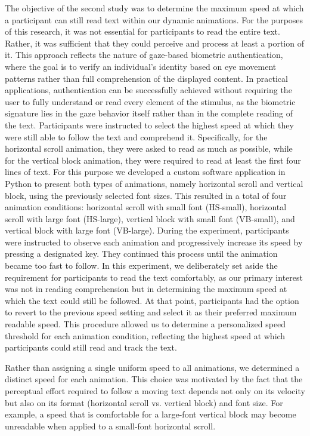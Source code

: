 \documentclass{article}
\begin{document}
The objective of the second study was to determine the maximum speed at which a participant can still read text within our dynamic animations. 
For the purposes of this research, it was not essential for participants to read the entire text. 
Rather, it was sufficient that they could perceive and process at least a portion of it. 
This approach reflects the nature of gaze-based biometric authentication, where the goal is to verify an individual's identity based on eye movement patterns rather than full comprehension of the displayed content. 
In practical applications, authentication can be successfully achieved without requiring the user to fully understand or read every element of the stimulus, as the biometric signature lies in the gaze behavior itself rather than in the complete reading of the text.
Participants were instructed to select the highest speed at which they were still able to follow the text and comprehend it.
Specifically, for the horizontal scroll animation, they were asked to read as much as possible, while for the vertical block animation, they were required to read at least the first four lines of text.
For this purpose we developed a custom software application in Python to present both types of animations, namely horizontal scroll and vertical block, using the previously selected font sizes.
This resulted in a total of four animation conditions: horizontal scroll with small font (HS-small), horizontal scroll with large font (HS-large), vertical block with small font (VB-small), and vertical block with large font (VB-large).
During the experiment, participants were instructed to observe each animation and progressively increase its speed by pressing a designated key. 
They continued this process until the animation became too fast to follow.
In this experiment, we deliberately set aside the requirement for participants to read the text comfortably, as our primary interest was not in reading comprehension but in determining the maximum speed at which the text could still be followed.
At that point, participants had the option to revert to the previous speed setting and select it as their preferred maximum readable speed. 
This procedure allowed us to determine a personalized speed threshold for each animation condition, reflecting the highest speed at which participants could still read and track the text. 

Rather than assigning a single uniform speed to all animations, we determined a distinct speed for each animation. 
This choice was motivated by the fact that the perceptual effort required to follow a moving text depends not only on its velocity but also on its format (horizontal scroll vs. vertical block) and font size. 
For example, a speed that is comfortable for a large-font vertical block may become unreadable when applied to a small-font horizontal scroll.
\end{document}
